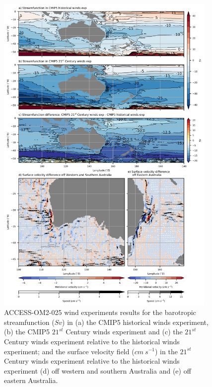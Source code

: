 \documentclass[draft,linenumbers]{agujournal2018}
\begin{document}
\begin{figure}[h]
\centering
\includegraphics[width=0.95\textwidth]{Bar_fig1_.png}
\caption{ACCESS-OM2-025 wind experiments results for the barotropic streamfunction ($Sv$) in (a) the CMIP5 historical winds experiment, (b) the CMIP5 $21^{st}$ Century winds experiment and (c) the $21^{st}$ Century winds experiment relative to the historical winds experiment; and the surface velocity field ($cm\ s^{-1}$) in the $21^{st}$ Century winds experiment relative to the historical winds experiment (d) off western and southern Australia and (e) off eastern Australia.}\label{Bar_fig1_}
\end{figure}
\end{document}
